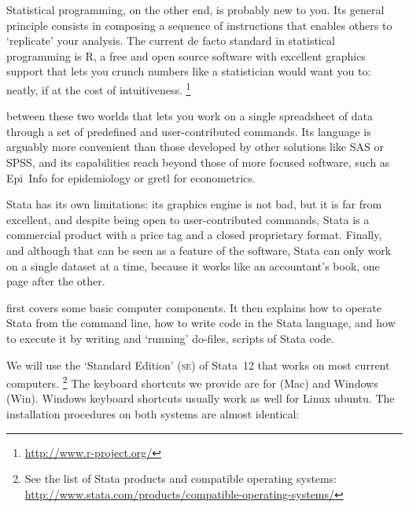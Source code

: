 Statistical programming, on the other end, is probably new to you. Its general principle consists in composing a sequence of instructions that enables others to `replicate' your analysis. The current de facto standard in statistical programming is R, a free and open source software with excellent graphics support that lets you crunch numbers like a statistician would want you to: neatly, if at the cost of intuitiveness.%
  \footnote{\url{http://www.r-project.org/}} %

 between these two worlds that lets you work on a single spreadsheet of data through a set of predefined and user-contributed commands. Its language is arguably more convenient than those developed by other solutions like SAS or SPSS, and its capabilities reach beyond those of more focused software, such as Epi~Info for epidemiology or gretl for econometrics.%

Stata has its own limitations: its graphics engine is not bad, but it is far from excellent, and despite being open to user-contributed commands, Stata is a commercial product with a price tag and a closed proprietary format. Finally, and although that can be seen as a feature of the software, Stata can only work on a single dataset at a time, because it works like an accountant's book, one page after the other.%

 first covers some basic computer components. It then explains how to operate Stata from the command line, how to write code in the Stata language, and how to execute it by writing and `running' do-files, scripts of Stata code.%

We will use the `Standard Edition' (\textsc{se}) of Stata~12 that works on most current computers.%
\footnote{See the list of Stata products and compatible operating systems: %
  \url{http://www.stata.com/products/compatible-operating-systems/}}%
  The keyboard shortcuts we provide are for \OSX (Mac) and Windows (Win). Windows keyboard shortcuts usually work as well for Linux ubuntu. The installation procedures on both systems are almost identical:%

